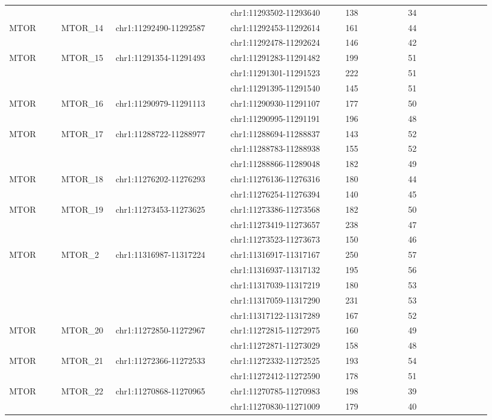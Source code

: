 \begin{landscape}
\begin{longtable}{p{0.1\linewidth}|p{0.1\linewidth}p{0.22\linewidth}p{0.22\linewidth}p{0.12\linewidth}p{0.16\linewidth}}
\\
 & & & chr1:11293502-11293640 & 138 & 34
\\
MTOR & MTOR\_14 & chr1:11292490-11292587 & chr1:11292453-11292614 & 161 & 44
\\
 & & & chr1:11292478-11292624 & 146 & 42
\\
MTOR & MTOR\_15 & chr1:11291354-11291493 & chr1:11291283-11291482 & 199 & 51
\\
 & & & chr1:11291301-11291523 & 222 & 51
\\
 & & & chr1:11291395-11291540 & 145 & 51
\\
MTOR & MTOR\_16 & chr1:11290979-11291113 & chr1:11290930-11291107 & 177 & 50
\\
 & & & chr1:11290995-11291191 & 196 & 48
\\
MTOR & MTOR\_17 & chr1:11288722-11288977 & chr1:11288694-11288837 & 143 & 52
\\
 & & & chr1:11288783-11288938 & 155 & 52
\\
 & & & chr1:11288866-11289048 & 182 & 49
\\
MTOR & MTOR\_18 & chr1:11276202-11276293 & chr1:11276136-11276316 & 180 & 44
\\
 & & & chr1:11276254-11276394 & 140 & 45
\\
MTOR & MTOR\_19 & chr1:11273453-11273625 & chr1:11273386-11273568 & 182 & 50
\\
 & & & chr1:11273419-11273657 & 238 & 47
\\
 & & & chr1:11273523-11273673 & 150 & 46
\\
MTOR & MTOR\_2 & chr1:11316987-11317224 & chr1:11316917-11317167 & 250 & 57
\\
 & & & chr1:11316937-11317132 & 195 & 56
\\
 & & & chr1:11317039-11317219 & 180 & 53
\\
 & & & chr1:11317059-11317290 & 231 & 53
\\
 & & & chr1:11317122-11317289 & 167 & 52
\\
MTOR & MTOR\_20 & chr1:11272850-11272967 & chr1:11272815-11272975 & 160 & 49
\\
 & & & chr1:11272871-11273029 & 158 & 48
\\
MTOR & MTOR\_21 & chr1:11272366-11272533 & chr1:11272332-11272525 & 193 & 54
\\
 & & & chr1:11272412-11272590 & 178 & 51
\\
MTOR & MTOR\_22 & chr1:11270868-11270965 & chr1:11270785-11270983 & 198 & 39
\\
 & & & chr1:11270830-11271009 & 179 & 40

\end{longtable}
\end{landscape}

